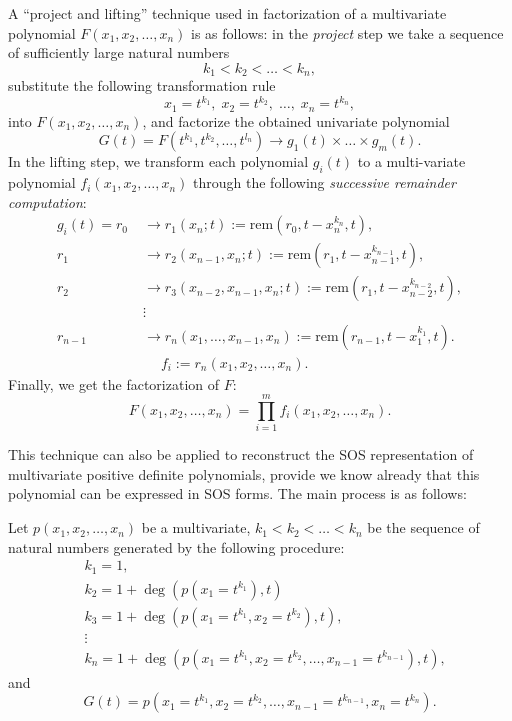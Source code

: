 \documentclass[runningheads]{llncs}
\begin{document}
{A ``project and lifting'' technique used in factorization of a multivariate polynomial \( F(x_1, x_2, \ldots, x_n) \) is as follows: in the {\it project\/} step we take a sequence of sufficiently large natural numbers 
\[ k_1 < k_2 < \ldots < k_n, \]
substitute the following transformation rule
\begin{equation}
x_1 = t^{k_1}, \; x_2 = t^{k_2}, \; \ldots, \; x_n = t^{k_n},
\label{substt}
\end{equation}
into $F(x_1,x_2,\ldots,x_n)$, and factorize
the obtained univariate polynomial
$$
G(t)=F(t^{k_1},t^{k_2},\ldots,t^{l_n})
\longrightarrow 
g_1(t) \times \ldots \times g_m(t).
$$
In the lifting step, we transform each polynomial $g_i(t)$ to a multi-variate polynomial $f_i(x_1,x_2,\ldots,x_n)$ 
through the following {\it successive remainder computation\/}: 
\begin{align}
   g_i(t)=r_0&\;{}{\longrightarrow}
   r_1(x_n;t):=\text{rem}(r_0,t-x_n^{k_n}, t),\nonumber\\
   r_1&\;{}{\longrightarrow}
   r_2(x_{n-1},x_{n};t):=\text{rem}(r_1,t-x_{n-1}^{k_{n-1}}, t),\nonumber\\
   r_2&\;{\longrightarrow}
   r_3(x_{n-2},x_{n-1},x_{n};t):=\text{rem}(r_1,t-x_{n-2}^{k_{n-2}}, t),\nonumber\\
   &\;\vdots\nonumber\\
   r_{n-1}&\;{}{\longrightarrow}
   r_{n}(x_1,\ldots,x_{n-1},x_n):=\text{rem}
   (r_{n-1},t-x_1^{k_1},t).
   \nonumber\\
  &\phantom{{}\longrightarrow}f_i:=r_n(x_1,x_2,\ldots,x_n).
  \label{eq-src}
\end{align}
Finally, we get the factorization of $F$:
$$
F(x_1,x_2,\ldots,x_n)=
\prod_{i=1}^{m}f_i(x_1,x_2,\ldots,x_n).
$$

This technique can also be applied to reconstruct the SOS representation of multivariate positive definite polynomials, provide we know already that this polynomial can be expressed in SOS forms.
The main process is as follows: 

Let 
\( p(x_1, x_2, \ldots, x_n) \) be a  multivariate, $k_1<k_2<\ldots<k_n$ be the sequence of natural numbers generated by the following procedure:
\begin{align*}
&k_1=1, \\   
&k_2=1+\deg(p(x_1=t^{k_1}),t)\\
&k_3=1+\deg(p(x_1=t^{k_1},x_2=t^{k_2}),t),\\
&\vdots\\
&k_n=1+\deg(p(x_1=t^{k_1},x_2=t^{k_2},\ldots, x_{n-1}=t^{k_{n-1}}),t), 
\end{align*}
and 
$$
G(t)=p(x_1=t^{k_1},x_2=t^{k_2},\ldots, x_{n-1}=t^{k_{n-1}}, x_n=t^{k_n}).
$$

}
\end{document}
